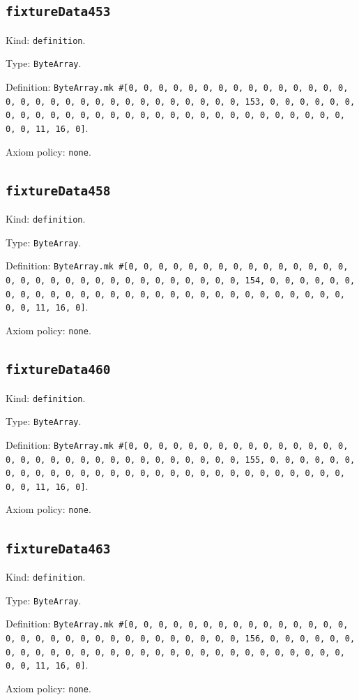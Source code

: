 \documentclass[11pt]{article}
\begin{document}
\subsection*{\texttt{fixtureData453}}
\noindent Kind: \texttt{definition}.\par
\noindent Type: \texttt{ByteArray}.\par
\noindent Definition: \texttt{ByteArray.mk \#[0, 0, 0, 0, 0, 0, 0, 0, 0, 0, 0, 0, 0, 0, 0, 0, 0, 0, 0, 0, 0, 0, 0, 0, 0, 0, 0, 0, 0, 0, 0, 153, 0, 0, 0, 0, 0, 0, 0, 0, 0, 0, 0, 0, 0, 0, 0, 0, 0, 0, 0, 0, 0, 0, 0, 0, 0, 0, 0, 0, 0, 0, 0, 11, 16, 0]}.\par
\noindent Axiom policy: \texttt{none}.\par
\subsection*{\texttt{fixtureData458}}
\noindent Kind: \texttt{definition}.\par
\noindent Type: \texttt{ByteArray}.\par
\noindent Definition: \texttt{ByteArray.mk \#[0, 0, 0, 0, 0, 0, 0, 0, 0, 0, 0, 0, 0, 0, 0, 0, 0, 0, 0, 0, 0, 0, 0, 0, 0, 0, 0, 0, 0, 0, 0, 154, 0, 0, 0, 0, 0, 0, 0, 0, 0, 0, 0, 0, 0, 0, 0, 0, 0, 0, 0, 0, 0, 0, 0, 0, 0, 0, 0, 0, 0, 0, 0, 11, 16, 0]}.\par
\noindent Axiom policy: \texttt{none}.\par
\subsection*{\texttt{fixtureData460}}
\noindent Kind: \texttt{definition}.\par
\noindent Type: \texttt{ByteArray}.\par
\noindent Definition: \texttt{ByteArray.mk \#[0, 0, 0, 0, 0, 0, 0, 0, 0, 0, 0, 0, 0, 0, 0, 0, 0, 0, 0, 0, 0, 0, 0, 0, 0, 0, 0, 0, 0, 0, 0, 155, 0, 0, 0, 0, 0, 0, 0, 0, 0, 0, 0, 0, 0, 0, 0, 0, 0, 0, 0, 0, 0, 0, 0, 0, 0, 0, 0, 0, 0, 0, 0, 11, 16, 0]}.\par
\noindent Axiom policy: \texttt{none}.\par
\subsection*{\texttt{fixtureData463}}
\noindent Kind: \texttt{definition}.\par
\noindent Type: \texttt{ByteArray}.\par
\noindent Definition: \texttt{ByteArray.mk \#[0, 0, 0, 0, 0, 0, 0, 0, 0, 0, 0, 0, 0, 0, 0, 0, 0, 0, 0, 0, 0, 0, 0, 0, 0, 0, 0, 0, 0, 0, 0, 156, 0, 0, 0, 0, 0, 0, 0, 0, 0, 0, 0, 0, 0, 0, 0, 0, 0, 0, 0, 0, 0, 0, 0, 0, 0, 0, 0, 0, 0, 0, 0, 11, 16, 0]}.\par
\noindent Axiom policy: \texttt{none}.\par
\end{document}
